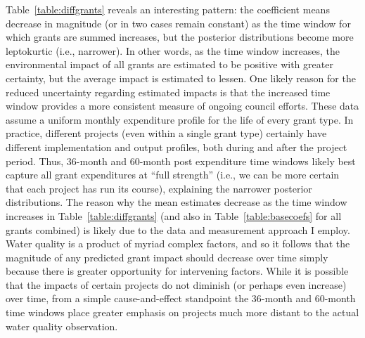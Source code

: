 \documentclass[12pt,a4paper,titlepage]{article}
\begin{document}
Table~\ref{table:diffgrants} reveals an interesting pattern: the coefficient means decrease in magnitude (or in two cases remain constant) as the time window for which grants are summed increases, but the posterior distributions become more leptokurtic (i.e., narrower). In other words, as the time window increases, the environmental impact of all grants are estimated to be positive with greater certainty, but the average impact is estimated to lessen. One likely reason for the reduced uncertainty regarding estimated impacts is that the increased time window provides a more consistent measure of ongoing council efforts. These data assume a uniform monthly expenditure profile for the life of every grant type. In practice, different projects (even within a single grant type) certainly have different implementation and output profiles, both during and after the project period. Thus, 36-month and 60-month post expenditure time windows likely best capture all grant expenditures at ``full strength'' (i.e., we can be more certain that each project has run its course), explaining the narrower posterior distributions. The reason why the mean estimates decrease as the time window increases in Table~\ref{table:diffgrants} (and also in Table~\ref{table:basecoefs} for all grants combined) is likely due to the data and measurement approach I employ. Water quality is a product of myriad complex factors, and so it follows that the magnitude of any predicted grant impact should decrease over time simply because there is greater opportunity for intervening factors. While it is possible that the impacts of certain projects do not diminish (or perhaps even increase) over time, from a simple cause-and-effect standpoint the 36-month and 60-month time windows place greater emphasis on projects much more distant to the actual water quality observation.
\end{document}
